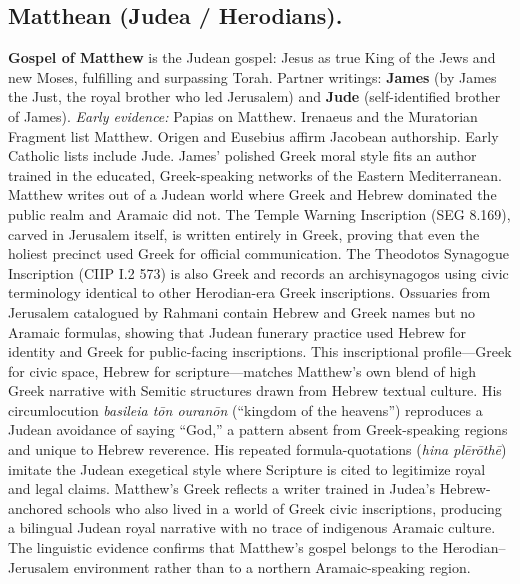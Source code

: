 \subsection{Matthean (Judea / Herodians).}
\textbf{Gospel of Matthew} is the Judean gospel: Jesus as true King of the Jews and new Moses, fulfilling and surpassing Torah.
Partner writings: \textbf{James} (by James the Just, the royal brother who led Jerusalem) and \textbf{Jude} (self-identified brother of James).
\emph{Early evidence:} Papias on Matthew.
Irenaeus and the Muratorian Fragment list Matthew.
Origen and Eusebius affirm Jacobean authorship.
Early Catholic lists include Jude.
James' polished Greek moral style fits an author trained in the educated, Greek-speaking networks of the Eastern Mediterranean.
Matthew writes out of a Judean world where Greek and Hebrew dominated the public realm and Aramaic did not.
The Temple Warning Inscription (SEG 8.169), carved in Jerusalem itself, is written entirely in Greek, proving that even the holiest precinct used Greek for official communication.
The Theodotos Synagogue Inscription (CIIP I.2 573) is also Greek and records an archisynagogos using civic terminology identical to other Herodian-era Greek inscriptions.
Ossuaries from Jerusalem catalogued by Rahmani contain Hebrew and Greek names but no Aramaic formulas, showing that Judean funerary practice used Hebrew for identity and Greek for public-facing inscriptions.
This inscriptional profile---Greek for civic space, Hebrew for scripture---matches Matthew's own blend of high Greek narrative with Semitic structures drawn from Hebrew textual culture.
His circumlocution \textit{basileia tōn ouranōn} (``kingdom of the heavens'') reproduces a Judean avoidance of saying ``God,'' a pattern absent from Greek-speaking regions and unique to Hebrew reverence.
His repeated formula-quotations (\textit{hina plērōthē}) imitate the Judean exegetical style where Scripture is cited to legitimize royal and legal claims.
Matthew's Greek reflects a writer trained in Judea's Hebrew-anchored schools who also lived in a world of Greek civic inscriptions, producing a bilingual Judean royal narrative with no trace of indigenous Aramaic culture.
The linguistic evidence confirms that Matthew's gospel belongs to the Herodian--Jerusalem environment rather than to a northern Aramaic-speaking region.

